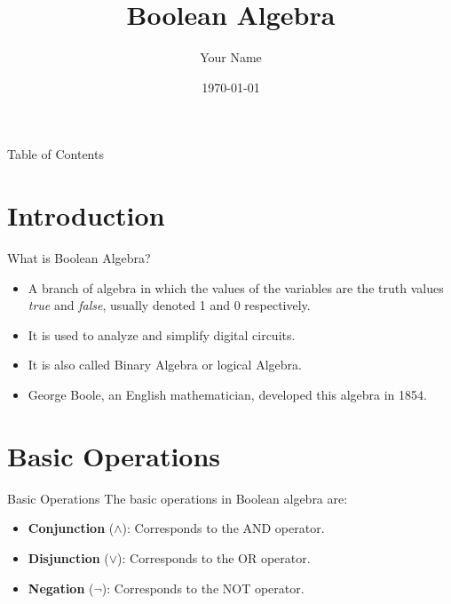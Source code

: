 \documentclass{beamer}
\title{Boolean Algebra}
\author{Your Name}
\date{\today}
\begin{document}
\begin{frame}
    \titlepage
\end{frame}

\begin{frame}{Table of Contents}
    \tableofcontents
\end{frame}

\section{Introduction}
\begin{frame}{What is Boolean Algebra?}
    \begin{itemize}
        \item A branch of algebra in which the values of the variables are the
        truth values \textit{true} and \textit{false}, usually denoted 1 and 0
        respectively.
        \item It is used to analyze and simplify digital circuits.
        \item It is also called Binary Algebra or logical Algebra.
        \item George Boole, an English mathematician, developed this algebra in
        1854.
    \end{itemize}
\end{frame}

\section{Basic Operations}
\begin{frame}{Basic Operations}
    The basic operations in Boolean algebra are:
    \begin{itemize}
        \item \textbf{Conjunction} ($\land$): Corresponds to the AND operator.
        \item \textbf{Disjunction} ($\lor$): Corresponds to the OR operator.
        \item \textbf{Negation} ($\neg$): Corresponds to the NOT operator.
    \end{itemize}
\end{frame}
\end{document}
